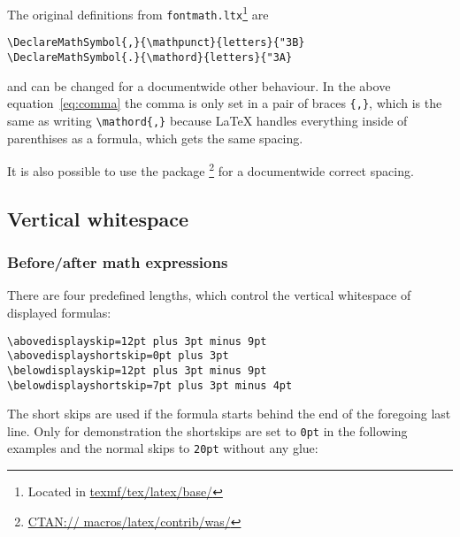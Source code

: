 \begin{table}[htb]
The original definitions from \verb+fontmath.ltx+\footnote{%
Located in \url{texmf/tex/latex/base/}} are

\begin{verbatim}
\DeclareMathSymbol{,}{\mathpunct}{letters}{"3B}
\DeclareMathSymbol{.}{\mathord}{letters}{"3A}
\end{verbatim}

\noindent{} and  
can be changed for a documentwide other behaviour. In the above equation~\ref{eq:comma} 
the comma is only set in a pair of braces \verb+{,}+, which is the same as writing 
\verb+\mathord{,}+ because \LaTeX{} handles everything
inside of parenthises as a formula, which gets the same spacing. 

It is also possible to use the package \footnote{%
\href{ftp://ftp.dante.de/tex-archive/macros/latex/contrib/was/}%
{CTAN:// macros/latex/contrib/was/}} for a documentwide
correct spacing.

\subsection{Vertical whitespace}\label{subsec:vwhitespace}
\subsubsection{Before/after math expressions}\label{subsubsec:displayskip}

There are four predefined lengths, which control the vertical whitespace
of displayed formulas:
\begin{verbatim}
\abovedisplayskip=12pt plus 3pt minus 9pt
\abovedisplayshortskip=0pt plus 3pt
\belowdisplayskip=12pt plus 3pt minus 9pt
\belowdisplayshortskip=7pt plus 3pt minus 4pt
\end{verbatim}
The short skips are used if the formula starts behind the end of the foregoing
last line. Only for demonstration the shortskips
are set to \verb|0pt| in the following examples and the normal skips to 
\verb|20pt| without any glue:

\medskip
\noindent{}


\end{table}
